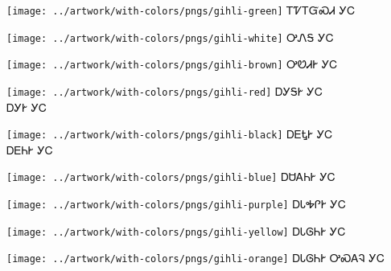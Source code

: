 \documentclass[avery5371]{flashcards}%
\begin{document}

\begin{flashcard}{
\texttt{[image: ../artwork/with-colors/pngs/gihli-green]}
}\Huge ᎢᏤᎢᏳᏍᏗ ᎩᏟ
\end{flashcard}

\begin{flashcard}{
\texttt{[image: ../artwork/with-colors/pngs/gihli-white]}
}\Huge ᎤᏁᎦ ᎩᏟ
\end{flashcard}

\begin{flashcard}{
\texttt{[image: ../artwork/with-colors/pngs/gihli-brown]}
}\Huge ᎤᏬᏗᎨ ᎩᏟ
\end{flashcard}

\begin{flashcard}{
\texttt{[image: ../artwork/with-colors/pngs/gihli-red]}
}\Huge ᎠᎩᎦᎨ ᎩᏟ\\ᎠᎩᎨ ᎩᏟ
\end{flashcard}

\begin{flashcard}{
\texttt{[image: ../artwork/with-colors/pngs/gihli-black]}
}\Huge ᎠᎬᎿᎨ ᎩᏟ\\ᎠᎬᏂᎨ ᎩᏟ
\end{flashcard}

\begin{flashcard}{
\texttt{[image: ../artwork/with-colors/pngs/gihli-blue]}
}\Huge ᎠᏌᎪᏂᎨ ᎩᏟ
\end{flashcard}

\begin{flashcard}{
\texttt{[image: ../artwork/with-colors/pngs/gihli-purple]}
}\Huge ᎠᏓᎭᎵᎨ ᎩᏟ
\end{flashcard}

\begin{flashcard}{
\texttt{[image: ../artwork/with-colors/pngs/gihli-yellow]}
}\Huge ᎠᏓᎶᏂᎨ ᎩᏟ
\end{flashcard}

\begin{flashcard}{
\texttt{[image: ../artwork/with-colors/pngs/gihli-orange]}
}\Huge ᎠᏓᎶᏂᎨ ᎤᏍᎪᎸ ᎩᏟ
\end{flashcard}
\end{document}
